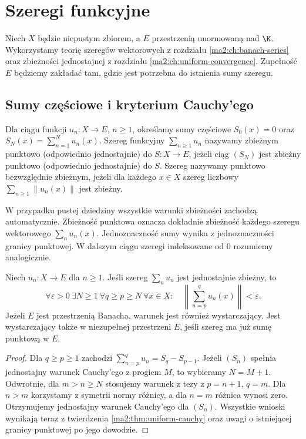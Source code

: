 \chapter{Szeregi funkcyjne}
\label{ma2:ch:function-series}

Niech $X$ będzie niepustym zbiorem, a $E$ przestrzenią
unormowaną nad $\K$. Wykorzystamy teorię szeregów
wektorowych z rozdziału \ref{ma2:ch:banach-series}
oraz zbieżności jednostajnej z rozdziału
\ref{ma2:ch:uniform-convergence}. Zupełność $E$
będziemy zakładać tam, gdzie jest potrzebna
do istnienia sumy szeregu.

\section{Sumy częściowe i kryterium Cauchy'ego}

\begin{definicja}
\label{ma2:def:function-series}
Dla ciągu funkcji $u_n:X\to E$, $n\ge1$, określamy
sumy częściowe $S_0(x)=0$ oraz
$S_N(x)=\sum_{n=1}^N u_n(x)$.
Szereg funkcyjny $\sum_{n\ge1}u_n$ nazywamy
zbieżnym punktowo (odpowiednio jednostajnie)
do $S:X\to E$, jeżeli ciąg $(S_N)$ jest zbieżny
punktowo (odpowiednio jednostajnie) do $S$.
Szereg nazywamy punktowo bezwzględnie zbieżnym,
jeżeli dla każdego $x\in X$ szereg liczbowy
$\sum_{n\ge1}\|u_n(x)\|$ jest zbieżny.
\end{definicja}
W przypadku pustej dziedziny wszystkie warunki
zbieżności zachodzą automatycznie.
Zbieżność punktowa oznacza dokładnie zbieżność
każdego szeregu wektorowego $\sum_n u_n(x)$.
Jednoznaczność sumy wynika z jednoznaczności
granicy punktowej. W dalszym ciągu szeregi
indeksowane od $0$ rozumiemy analogicznie.

\begin{twierdzenie}
\label{ma2:thm:function-series-cauchy}
Niech $u_n:X\to E$ dla $n\ge1$.
Jeśli szereg $\sum_n u_n$ jest jednostajnie zbieżny,
to
\[
 \forall\varepsilon>0\ \exists N\ge1\
 \forall q\ge p\ge N\ \forall x\in X:
 \quad \left\|\sum_{n=p}^q u_n(x)\right\|<\varepsilon.
\]
Jeżeli $E$ jest przestrzenią Banacha, warunek jest
również wystarczający. Jest wystarczający także
w niezupełnej przestrzeni $E$, jeśli szereg ma już
sumę punktową w $E$.
\end{twierdzenie}
\begin{proof}
Dla $q\ge p\ge1$ zachodzi
$\sum_{n=p}^q u_n=S_q-S_{p-1}$.
Jeżeli $(S_n)$ spełnia jednostajny warunek
Cauchy'ego z progiem $M$, to wybieramy $N=M+1$.
Odwrotnie, dla $m>n\ge N$ stosujemy warunek
z tezy z $p=n+1$, $q=m$. Dla $n>m$ korzystamy
z symetrii normy różnicy, a dla $n=m$ różnica
wynosi zero. Otrzymujemy jednostajny warunek
Cauchy'ego dla $(S_n)$.
Wszystkie wnioski wynikają teraz z twierdzenia
\ref{ma2:thm:uniform-cauchy} oraz uwagi o istniejącej
granicy punktowej po jego dowodzie.
\end{proof}

